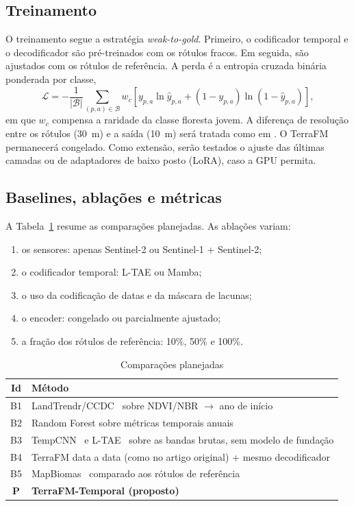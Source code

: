 \documentclass[conference]{IEEEtran}
\begin{document}
\subsection{Treinamento}

O treinamento segue a estratégia \textit{weak-to-gold}. Primeiro, o codificador temporal e o decodificador são pré-treinados com os rótulos fracos. Em seguida, são ajustados com os rótulos de referência. A perda é a entropia cruzada binária ponderada por classe,
\begin{equation}
\mathcal{L} = -\frac{1}{|\mathcal{B}|}\sum_{(p,a)\in\mathcal{B}} w_{c}\left[y_{p,a}\ln\hat{y}_{p,a} + (1-y_{p,a})\ln(1-\hat{y}_{p,a})\right],\label{eq:perda}
\end{equation}
em que $w_c$ compensa a raridade da classe floresta jovem. A diferença de resolução entre os rótulos (30~m) e a saída (10~m) será tratada como em \citet{silvafilho2024}. O TerraFM permanecerá congelado. Como extensão, serão testados o ajuste das últimas camadas ou de adaptadores de baixo posto (LoRA), caso a GPU permita.

\subsection{Baselines, ablações e métricas}

A Tabela~\ref{tab:baselines} resume as comparações planejadas. As ablações variam:
\begin{enumerate}
\item os sensores: apenas Sentinel-2 ou Sentinel-1 + Sentinel-2;
\item o codificador temporal: L-TAE ou Mamba;
\item o uso da codificação de datas e da máscara de lacunas;
\item o encoder: congelado ou parcialmente ajustado;
\item a fração dos rótulos de referência: 10\%, 50\% e 100\%.
\end{enumerate}

\begin{table}[htbp]
\caption{Comparações planejadas}
\begin{center}
\footnotesize
\begin{tabular}{|c|p{6.3cm}|}
\hline
\textbf{Id} & \textbf{Método} \\
\hline
B1 & LandTrendr/CCDC~\citep{kennedy2010,zhu2014} sobre NDVI/NBR $\rightarrow$ ano de início \\
B2 & Random Forest sobre métricas temporais anuais~\citep{simoes2021} \\
B3 & TempCNN~\citep{pelletier2019} e L-TAE~\citep{garnot2020ltae} sobre as bandas brutas, sem modelo de fundação \\
B4 & TerraFM data a data (como no artigo original) + mesmo decodificador \\
B5 & MapBiomas~\citep{souza2020} comparado aos rótulos de referência \\
\textbf{P} & \textbf{TerraFM-Temporal (proposto)} \\
\hline
\end{tabular}
\label{tab:baselines}
\end{center}
\end{table}
\end{document}
